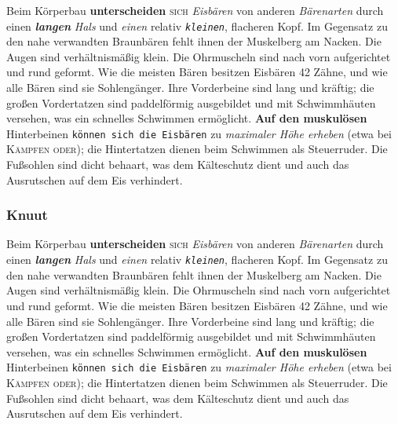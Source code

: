 \documentclass{article}
\begin{document}
Beim Körperbau \textbf{unterscheiden} \textsc{sich} \emph{Eisbären}
von \textsf{anderen} \textit{Bärenarten} durch einen
\textbf{\textit{langen}} \textsl{\textit{Hals}} und
\textsf{\textit{einen}} relativ \texttt{\textit{kleinen}}, {\Huge
  flacheren} {\tiny Kopf}. Im {\LARGE Gegensatz} zu den nahe
verwandten Braunbären fehlt ihnen der Muskelberg am Nacken. Die Augen
sind verhältnismäßig klein. Die Ohrmuscheln sind nach vorn
aufgerichtet und rund geformt. Wie die meisten Bären besitzen Eisbären
42 Zähne, und wie alle Bären sind sie Sohlengänger. Ihre Vorderbeine
sind lang und kräftig; die großen Vordertatzen sind paddelförmig
ausgebildet und mit Schwimmhäuten versehen, was ein schnelles
Schwimmen ermöglicht. \textbf{\Huge Auf den muskulösen} Hinterbeinen
\texttt{\tiny können sich die Eisbären} zu \textit{\LARGE maximaler Höhe erheben} (etwa
bei \textsc{\huge Kämpfen oder}); die Hintertatzen
dienen beim Schwimmen als Steuerruder. Die Fußsohlen sind dicht
behaart, was dem Kälteschutz dient und auch das Ausrutschen auf dem
Eis verhindert. 
\subsubsection{Knuut}
\blindtext

Beim Körperbau \textbf{unterscheiden} \textsc{sich} \emph{Eisbären}
von \textsf{anderen} \textit{Bärenarten} durch einen
\textbf{\textit{langen}} \textsl{\textit{Hals}} und
\textsf{\textit{einen}} relativ \texttt{\textit{kleinen}}, {\Huge
  flacheren} {\tiny Kopf}. Im {\LARGE Gegensatz} zu den nahe
verwandten Braunbären fehlt ihnen der Muskelberg am Nacken. Die Augen
sind verhältnismäßig klein. Die Ohrmuscheln sind nach vorn
aufgerichtet und rund geformt. Wie die meisten Bären besitzen Eisbären
42 Zähne, und wie alle Bären sind sie Sohlengänger. Ihre Vorderbeine
sind lang und kräftig; die großen Vordertatzen sind paddelförmig
ausgebildet und mit Schwimmhäuten versehen, was ein schnelles
Schwimmen ermöglicht. \textbf{\Huge Auf den muskulösen} Hinterbeinen
\texttt{\tiny können sich die Eisbären} zu \textit{\LARGE maximaler Höhe erheben} (etwa
bei \textsc{\huge Kämpfen oder}); die Hintertatzen
dienen beim Schwimmen als Steuerruder. Die Fußsohlen sind dicht
behaart, was dem Kälteschutz dient und auch das Ausrutschen auf dem
Eis verhindert. 
\end{document}
